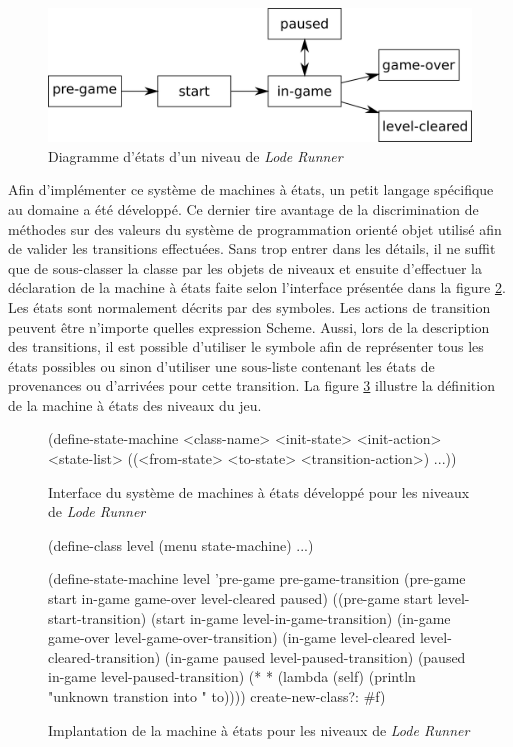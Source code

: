 \documentclass[12pt,twoside,letterpaper,francais]{book}
\newcommand{\scheme}[1]{\selectlanguage{english}{\tt #1}\selectlanguage{french}}
\begin{document}
\begin{figure}[htb!]
  \center
  \includegraphics[scale=0.7]{lr-state-diag}
  \caption{Diagramme d'états d'un niveau de \textit{Lode Runner}}
  \label{Exp:lr-state-diag}
\end{figure}

Afin d'implémenter ce système de machines à états, un petit langage
spécifique au domaine a été développé. Ce dernier tire avantage de la
discrimination de méthodes sur des valeurs du système de programmation
orienté objet utilisé afin de valider les transitions effectuées. Sans
trop entrer dans les détails, il ne suffit que de sous-classer la
classe \scheme{state-machine} par les objets de niveaux et ensuite
d'effectuer la déclaration de la machine à états faite selon
l'interface présentée dans la figure \ref{Exp:def-state}. Les états
sont normalement décrits par des symboles. Les actions de transition
peuvent être n'importe quelles expression Scheme. Aussi, lors de
la description des transitions, il est possible d'utiliser le symbole
\scheme{*} afin de représenter tous les états possibles ou sinon
d'utiliser une sous-liste contenant les états de provenances ou
d'arrivées pour cette transition. La figure
\ref{Exp:lr-lvl-state-machine} illustre la définition de la machine à
états des niveaux du jeu.\\

\begin{figure}[htb1]
  \begin{schemecode}
(define-state-machine 
  <class-name> <init-state> <init-action> <state-list>
  ((<from-state> <to-state> <transition-action>) ...))
  \end{schemecode}
  \caption{Interface du système de machines à états développé pour les
    niveaux de \textit{Lode Runner}}
  \label{Exp:def-state}
\end{figure}

\begin{figure}[htb!]
  \begin{schemecode}
(define-class level (menu state-machine) ...)

(define-state-machine level
  'pre-game pre-game-transition
  (pre-game start in-game game-over level-cleared paused)
  ((pre-game start         level-start-transition)
   (start    in-game       level-in-game-transition)
   (in-game  game-over     level-game-over-transition)
   (in-game  level-cleared level-cleared-transition)
   (in-game  paused        level-paused-transition)
   (paused   in-game       level-paused-transition)
   (* * (lambda (self) (println "unknown transtion into " to))))
  create-new-class?: \#f)
  \end{schemecode}
  \caption{Implantation de la machine à états pour les niveaux de \textit{Lode Runner}}
  \label{Exp:lr-lvl-state-machine}
\end{figure}
\end{document}
